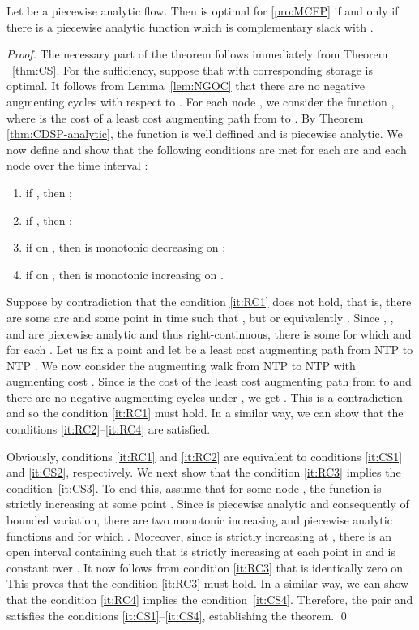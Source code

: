 \documentclass{svjour3}                     \smartqed
\begin{document}
\begin{theorem}
\label{thm:RC}
Let  be a piecewise analytic flow.
Then  is optimal for \eqref{pro:MCFP} if and only if there is a piecewise analytic function  which is complementary slack with .
\end{theorem}
\begin{proof}
The necessary part of the theorem follows immediately from Theorem ~\ref{thm:CS}. For the sufficiency, suppose that  with corresponding storage  is optimal. It follows from Lemma~\ref{lem:NGOC} that there are no negative augmenting cycles with respect to . For each node , we consider the function , where  is the cost of a least cost augmenting path from  to . By Theorem \ref{thm:CDSP-analytic}, the function  is well deffined and is piecewise analytic. We now define  and show that the following conditions are met for each arc  and each node  over the time interval :
\begin{enumerate}[label = (RC\arabic*), leftmargin = *]
\item\label{it:RC1} if , then ;
\item\label{it:RC2} if , then ;
\item\label{it:RC3} if  on , then  is monotonic decreasing on ;
\item\label{it:RC4} if  on , then  is monotonic increasing on .
\end{enumerate}
Suppose by contradiction that the condition \ref{it:RC1} does not hold, that is, there are some arc  and some point in time  such that , but  or equivalently . Since , , and  are piecewise analytic and thus right-continuous, there is some  for which  and  for each . Let us fix a point  and let  be a least cost augmenting path from NTP  to NTP . We now consider the augmenting walk  from NTP  to NTP  with augmenting cost . Since  is the cost of the least cost augmenting path from  to  and there are no negative augmenting cycles under , we get . This is a contradiction and so the condition \ref{it:RC1} must hold. In a similar way, we can show that the conditions \ref{it:RC2}--\ref{it:RC4} are satisfied.

Obviously, conditions \ref{it:RC1} and \ref{it:RC2} are equivalent to conditions \ref{it:CS1} and \ref{it:CS2}, respectively. We next show that the condition \ref{it:RC3} implies the condition~\ref{it:CS3}. To end this, assume that for some node , the function  is strictly increasing at some point . Since  is piecewise analytic and consequently of bounded variation, there are two monotonic increasing and piecewise analytic functions  and  for which . Moreover, since  is strictly increasing at , there is an open interval  containing  such that  is strictly increasing at each point in  and  is constant over . It now follows from condition \ref{it:RC3} that  is identically zero on . This proves that the condition \ref{it:RC3} must hold. In a similar way, we can show that the condition \ref{it:RC4} implies the condition~\ref{it:CS4}. Therefore, the pair  and  satisfies the conditions \ref{it:CS1}--\ref{it:CS4}, establishing the theorem.
\qed\end{proof}
\end{document}
